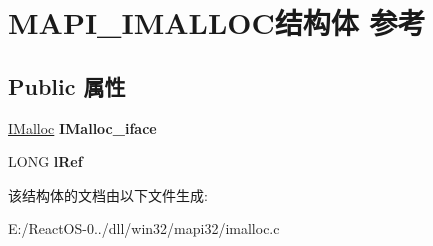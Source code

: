 \hypertarget{struct_m_a_p_i___i_m_a_l_l_o_c}{}\section{M\+A\+P\+I\+\_\+\+I\+M\+A\+L\+L\+O\+C结构体 参考}
\label{struct_m_a_p_i___i_m_a_l_l_o_c}
\subsection*{Public 属性}
\begin{DoxyCompactItemize}
\item 
\mbox{\label{struct_m_a_p_i___i_m_a_l_l_o_c_a703898121bbe0d44d16407926ab69de9}} 
\hyperlink{interface_i_malloc}{I\+Malloc} {\bfseries I\+Malloc\+\_\+iface}
\item 
\mbox{\label{struct_m_a_p_i___i_m_a_l_l_o_c_a2140fcf75086047ed3319232450229e0}} 
L\+O\+NG {\bfseries l\+Ref}
\end{DoxyCompactItemize}


该结构体的文档由以下文件生成\+:\begin{DoxyCompactItemize}
\item 
E\+:/\+React\+O\+S-\/0../dll/win32/mapi32/imalloc.\+c\end{DoxyCompactItemize}

